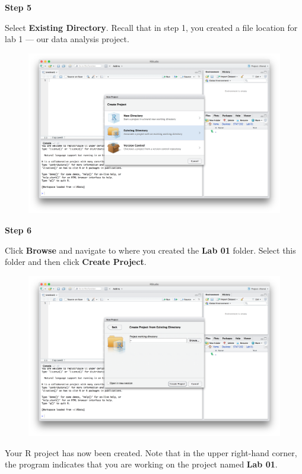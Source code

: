 \documentclass[]{book}
\theoremstyle{definition}
\theoremstyle{definition}
\theoremstyle{definition}
\theoremstyle{remark}
\begin{document}
\textbf{Step 5}

Select \textbf{Existing Directory}. Recall that in step 1, you created a
file location for lab 1 --- our data analysis project.

\begin{figure}[htbp]
\centering
\includegraphics{./assets/images/01-03.png}
\caption{}
\end{figure}

\textbf{Step 6}

Click \textbf{Browse} and navigate to where you created the \textbf{Lab
01} folder. Select this folder and then click \textbf{Create Project}.

\begin{figure}[htbp]
\centering
\includegraphics{./assets/images/01-04.png}
\caption{}
\end{figure}

Your R project has now been created. Note that in the upper right-hand
corner, the program indicates that you are working on the project named
\textbf{Lab 01}.
\end{document}
